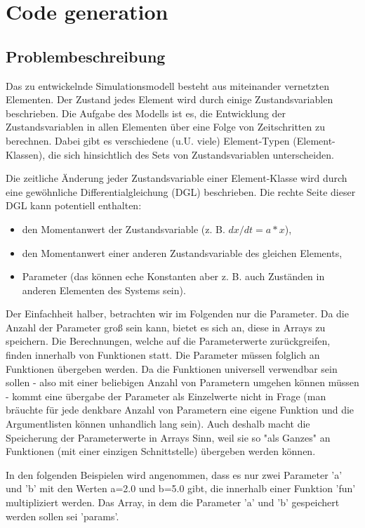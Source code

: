 \chapter{Code generation}  \label{app:codegen}
\renewcommand{\tabdir}{appendix/codegen/tab}
\renewcommand{\figdir}{appendix/codegen/fig}

\section{Problembeschreibung}
Das zu entwickelnde Simulationsmodell besteht aus miteinander vernetzten Elementen. Der Zustand jedes Element wird durch einige Zustandsvariablen beschrieben. Die Aufgabe des Modells ist es, die Entwicklung der Zustandsvariablen in allen Elementen über eine Folge von Zeitschritten zu berechnen. Dabei gibt es verschiedene (u.U. viele) Element-Typen (Element-Klassen), die sich hinsichtlich des Sets von Zustandsvariablen unterscheiden.

Die zeitliche Änderung jeder Zustandsvariable einer Element-Klasse wird durch eine gewöhnliche Differentialgleichung (DGL) beschrieben. Die rechte Seite dieser DGL kann potentiell enthalten:
\begin{itemize}
\item den Momentanwert der Zustandsvariable (z. B. $dx/dt = a * x$),
\item den Momentanwert einer anderen Zustandsvariable des gleichen Elements,
\item Parameter (das können eche Konstanten aber z. B. auch Zuständen in anderen Elementen des Systems sein).
\end{itemize}

Der Einfachheit halber, betrachten wir im Folgenden nur die Parameter. Da die Anzahl der Parameter groß sein kann, bietet es sich an, diese in Arrays zu speichern. Die Berechnungen, welche auf die Parameterwerte zurückgreifen, finden innerhalb von Funktionen statt. Die Parameter müssen folglich an Funktionen übergeben werden. Da die Funktionen universell verwendbar sein sollen - also mit einer beliebigen Anzahl von Parametern umgehen können müssen - kommt eine übergabe der Parameter als Einzelwerte nicht in Frage (man bräuchte für jede denkbare Anzahl von Parametern eine eigene Funktion und die Argumentlisten können unhandlich lang sein). Auch deshalb macht die Speicherung der Parameterwerte in Arrays Sinn, weil sie so "als Ganzes" an Funktionen (mit einer einzigen Schnittstelle) übergeben werden können.

In den folgenden Beispielen wird angenommen, dass es nur zwei Parameter 'a' und 'b' mit den Werten a=2.0 und b=5.0 gibt, die innerhalb einer Funktion 'fun' multipliziert werden. Das Array, in dem die Parameter 'a' und 'b' gespeichert werden sollen sei 'params'.

